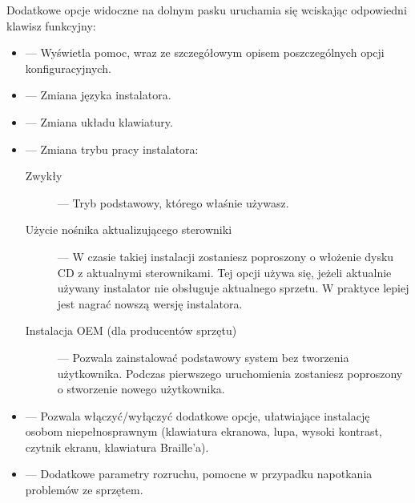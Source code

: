 Dodatkowe opcje widoczne na dolnym pasku uruchamia się wciskając odpowiedni klawisz funkcyjny:
\begin{itemize}
\item {} --- Wyświetla pomoc, wraz ze szczegółowym opisem poszczególnych opcji konfiguracyjnych.
\item {} --- Zmiana języka instalatora.
\item {} --- Zmiana układu klawiatury.
\item {} --- Zmiana trybu pracy instalatora:
        \begin{description}
        \item[\textcolor{ubuntu_orange}{Zwykły}] --- Tryb podstawowy, którego właśnie używasz.
        \item[\textcolor{ubuntu_orange}{Użycie nośnika aktualizującego sterowniki}] --- W czasie takiej instalacji zostaniesz poproszony o włożenie dysku CD z aktualnymi sterownikami. Tej opcji używa się, jeżeli aktualnie używany instalator nie obsługuje aktualnego sprzetu. W praktyce lepiej jest nagrać nowszą wersję instalatora.
        \item[\textcolor{ubuntu_orange}{Instalacja OEM (dla producentów sprzętu)}] --- Pozwala zainstalować podstawowy system bez tworzenia użytkownika. Podczas pierwszego uruchomienia zostaniesz poproszony o stworzenie nowego użytkownika.
        \end{description}
\item {} --- Pozwala włączyć/wyłączyć dodatkowe opcje, ułatwiające instalację osobom niepełnosprawnym (klawiatura ekranowa, lupa, wysoki kontrast, czytnik ekranu, klawiatura Braille'a).
\item {} --- Dodatkowe parametry rozruchu, pomocne w przypadku napotkania problemów ze sprzętem.
\end{itemize}
